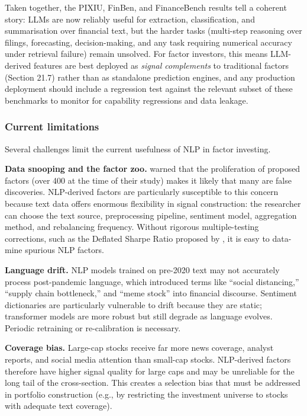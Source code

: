 Taken together, the PIXIU, FinBen, and FinanceBench results tell a coherent story: LLMs are now reliably useful for extraction, classification, and summarisation over financial text, but the harder tasks (multi-step reasoning over filings, forecasting, decision-making, and any task requiring numerical accuracy under retrieval failure) remain unsolved. For factor investors, this means LLM-derived features are best deployed as \textit{signal complements} to traditional factors (Section 21.7) rather than as standalone prediction engines, and any production deployment should include a regression test against the relevant subset of these benchmarks to monitor for capability regressions and data leakage.

\subsubsection{Current limitations}

Several challenges limit the current usefulness of NLP in factor investing.

\textbf{Data snooping and the factor zoo.} \cite{harvey2016and} warned that the proliferation of proposed factors (over 400 at the time of their study) makes it likely that many are false discoveries. NLP-derived factors are particularly susceptible to this concern because text data offers enormous flexibility in signal construction: the researcher can choose the text source, preprocessing pipeline, sentiment model, aggregation method, and rebalancing frequency. Without rigorous multiple-testing corrections, such as the Deflated Sharpe Ratio proposed by \cite{bailey2014deflated}, it is easy to data-mine spurious NLP factors.

\textbf{Language drift.} NLP models trained on pre-2020 text may not accurately process post-pandemic language, which introduced terms like ``social distancing,'' ``supply chain bottleneck,'' and ``meme stock'' into financial discourse. Sentiment dictionaries are particularly vulnerable to drift because they are static; transformer models are more robust but still degrade as language evolves. Periodic retraining or re-calibration is necessary.

\textbf{Coverage bias.} Large-cap stocks receive far more news coverage, analyst reports, and social media attention than small-cap stocks. NLP-derived factors therefore have higher signal quality for large caps and may be unreliable for the long tail of the cross-section. This creates a selection bias that must be addressed in portfolio construction (e.g., by restricting the investment universe to stocks with adequate text coverage).

